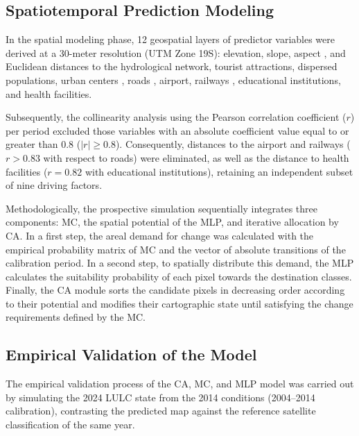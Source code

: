 \documentclass[runningheads]{llncs}
\begin{document}
\subsection{Spatiotemporal Prediction Modeling}
\label{subsec:modelado_prediccion_espaciotemporal}

In the spatial modeling phase, 12 geospatial layers of predictor variables were derived at a 30-meter resolution (UTM Zone 19S): elevation, slope, aspect \cite{424_Maddah2025}, and Euclidean distances to the hydrological network, tourist attractions, dispersed populations, urban centers \cite{461_Sarfo_2024}, roads \cite{454_AlKordi2025Landslide}, airport, railways \cite{004_urbanWatersWuhan}, educational institutions, and health facilities.

Subsequently, the collinearity analysis using the Pearson correlation coefficient ($r$) per period excluded those variables with an absolute coefficient value equal to or greater than $0.8$ ($|r| \geq 0.8$). Consequently, distances to the airport and railways ($r > 0.83$ with respect to roads) were eliminated, as well as the distance to health facilities ($r = 0.82$ with educational institutions), retaining an independent subset of nine driving factors.

Methodologically, the prospective simulation sequentially integrates three components: MC, the spatial potential of the MLP, and iterative allocation by CA. In a first step, the areal demand for change was calculated with the empirical probability matrix of MC and the vector of absolute transitions of the calibration period. In a second step, to spatially distribute this demand, the MLP calculates the suitability probability of each pixel towards the destination classes. Finally, the CA module sorts the candidate pixels in decreasing order according to their potential and modifies their cartographic state until satisfying the change requirements defined by the MC.

\subsection{Empirical Validation of the Model}
\label{subsec:validacion_empirica}

The empirical validation process of the CA, MC, and MLP model was carried out by simulating the 2024 LULC state from the 2014 conditions (2004--2014 calibration), contrasting the predicted map against the reference satellite classification of the same year.
\end{document}
